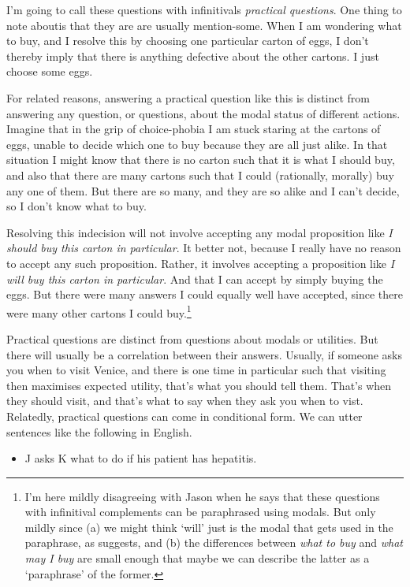 \documentclass[11pt,]{book}
\providecommand{\tightlist}{%
  \setlength{\itemsep}{0pt}\setlength{\parskip}{0pt}}
\let\rmarkdownfootnote\footnote%
\def\footnote{\protect\rmarkdownfootnote}
\begin{document}
I'm going to call these questions with infinitivals \emph{practical questions}. One thing to note aboutis that they are are usually mention-some. When I am wondering what to buy, and I resolve this by choosing one particular carton of eggs, I don't thereby imply that there is anything defective about the other cartons. I just choose some eggs.

For related reasons, answering a practical question like this is distinct from answering any question, or questions, about the modal status of different actions. Imagine that in the grip of choice-phobia I am stuck staring at the cartons of eggs, unable to decide which one to buy because they are all just alike. In that situation I might know that there is no carton such that it is what I should buy, and also that there are many cartons such that I could (rationally, morally) buy any one of them. But there are so many, and they are so alike and I can't decide, so I don't know what to buy.

Resolving this indecision will not involve accepting any modal proposition like \emph{I should buy this carton in particular}. It better not, because I really have no reason to accept any such proposition. Rather, it involves accepting a proposition like \emph{I will buy this carton in particular}. And that I can accept by simply buying the eggs. But there were many answers I could equally well have accepted, since there were many other cartons I could buy.\footnote{I'm here mildly disagreeing with Jason \citet[Ch. 5]{Stanley2011} when he says that these questions with infinitival complements can be paraphrased using modals. But only mildly since (a) we might think `will' just is the modal that gets used in the paraphrase, as \citet{Bhatt1999} suggests, and (b) the differences between \emph{what to buy} and \emph{what may I buy} are small enough that maybe we can describe the latter as a `paraphrase' of the former.}

Practical questions are distinct from questions about modals or utilities. But there will usually be a correlation between their answers. Usually, if someone asks you when to visit Venice, and there is one time in particular such that visiting then maximises expected utility, that's what you should tell them. That's when they should visit, and that's what to say when they ask you when to vist. Relatedly, practical questions can come in conditional form. We can utter sentences like the following in English.

\begin{itemize}
\tightlist
\item
  J asks K what to do if his patient has hepatitis.
\end{itemize}
\end{document}
